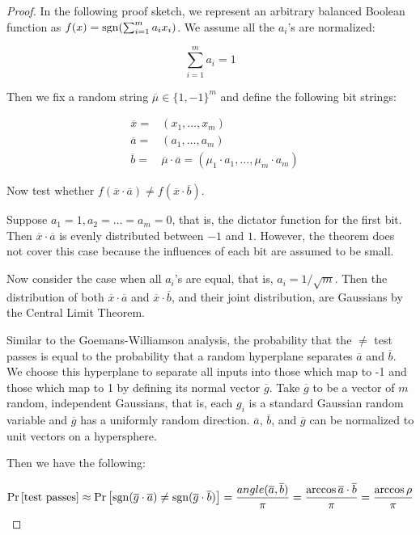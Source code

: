 \documentclass[12pt]{article}
\begin{document}
\begin{proof}
In the following proof sketch, we represent an arbitrary balanced Boolean
function as $f(x) = \mathop{\rm {sgn}}(\sum_{i=1}^m{a_i x_i})$. We assume all the $a_i$'s are
normalized:

\begin{equation}
\sum_{i=1}^m{a_i} = 1
\end{equation}

Then we fix a random string $\overline{\mu} \in \{1,-1\}^m$ and
define the following bit strings:

\begin{eqnarray*}
& \overline{x} = & (x_1, \ldots, x_m)\\
& \overline{a} = & (a_1, \ldots, a_m)\\
& \overline{b} = & \overline{\mu}\cdot\overline{a} = (\mu_1\cdot a_1, \ldots, \mu_m\cdot a_m)
\end{eqnarray*}

Now test whether
$f(\overline{x}\cdot\overline{a}) \ne f(\overline{x}\cdot\overline{b})$.

Suppose $a_1 = 1, a_2 = \ldots = a_m = 0$, that is, the dictator function for
the first bit. Then $\overline{x}\cdot\overline{a}$ is evenly distributed
between $-1$ and $1$. However, the theorem does not cover this case because
the influences of each bit are assumed to be small.

Now consider the case when all $a_i$'s are equal, that is, $a_i = 1/\sqrt{m}$.
Then the distribution of both $\overline{x}\cdot\overline{a}$ and
$\overline{x}\cdot\overline{b}$, and their joint distribution,
are Gaussians by the Central Limit Theorem.

Similar to the Goemans-Williamson analysis, the probability that the
$\ne$ test passes is equal to the probability that a random hyperplane
separates $\overline{a}$ and $\overline{b}$. We choose this
hyperplane to separate all inputs into those which map to -1 and those which
map to 1 by defining its normal vector $\overline{g}$.
Take $\overline{g}$ to be a vector of $m$ random, independent Gaussians,
that is, each $g_i$ is a standard Gaussian random variable and $\overline{g}$
has a uniformly random direction. $\overline{a}$, $\overline{b}$, and
$\overline{g}$ can be normalized to unit vectors on a hypersphere.

Then we have the following:

\begin{equation}
\Pr\left[\textrm{test passes}\right] \approx
\Pr\left[\mathop{\rm {sgn}}(\overline{g}\cdot\overline{a}) \ne
\mathop{\rm {sgn}}(\overline{g}\cdot\overline{b})\right] =
\frac{angle(\overline{a},\overline{b})}{\pi} =
\frac{\arccos{\overline{a}\cdot\overline{b}}}{\pi} =
\frac{\arccos{\rho}}{\pi}
\end{equation}


\end{proof}
\end{document}
